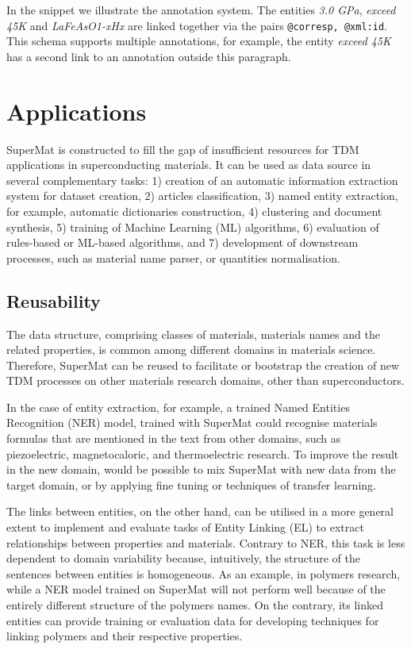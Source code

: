 \documentclass[fleqn,10pt]{wlscirep}
\begin{document}
In the snippet we illustrate the annotation system. The entities \textit{3.0 GPa}, \textit{exceed 45K} and \textit{LaFeAsO1-xHx} are linked together via the pairs \texttt{@corresp, @xml:id}. 
This schema supports multiple annotations, for example, the entity \textit{exceed 45K} has a second link to an annotation outside this paragraph.


\section*{Applications}
\label{sec:applications}
SuperMat is constructed to fill the gap of insufficient resources for TDM applications in superconducting materials. It can be used as data source in several complementary tasks: 
1) creation of an automatic information extraction system for dataset creation, 
2) articles classification, 
3) named entity extraction, for example, automatic dictionaries construction, 
4) clustering and document synthesis,
5) training of Machine Learning (ML) algorithms,
6) evaluation of rules-based or ML-based algorithms, and 
7) development of downstream processes, such as material name parser, or quantities normalisation.

\subsection*{Reusability}
The data structure, comprising classes of materials, materials names and the related properties, is common among different domains in materials science. 
Therefore, SuperMat can be reused to facilitate or bootstrap the creation of new TDM processes on other materials research domains, other than superconductors.

In the case of entity extraction, for example, a trained Named Entities Recognition (NER) model, trained with SuperMat could recognise materials formulas that are mentioned in the text from other domains, such as piezoelectric, magnetocaloric, and thermoelectric research.
To improve the result in the new domain, would be possible to mix SuperMat with new data from the target domain, or by applying fine tuning or techniques of transfer learning. 

The links between entities, on the other hand, can be utilised in a more general extent to implement and evaluate tasks of Entity Linking (EL) to extract relationships between properties and materials. 
Contrary to NER, this task is less dependent to domain variability because, intuitively, the structure of the sentences between entities is homogeneous.
As an example, in polymers research, while a NER model trained on SuperMat will not perform well because of the entirely different structure of the polymers names. On the contrary, its linked entities can provide training or evaluation data for developing techniques for linking polymers and their respective properties.
\end{document}
